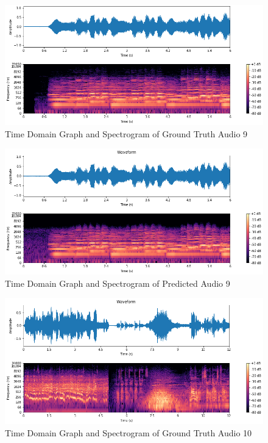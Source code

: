 \documentclass{ioereport}
\begin{document}
    \begin{figure}[H]
        \centering
        \includegraphics[width=\linewidth]{assets/audio_results/06seconds.png}
        \caption{Time Domain Graph and Spectrogram of Ground Truth Audio 9}
        \label{fig:gt-6s-spec}
    \end{figure}
    
    \begin{figure}[H]
        \centering
        \includegraphics[width=\linewidth]{assets/audio_results/06secondspred.png}
        \caption{Time Domain Graph and Spectrogram of Predicted Audio 9}
        \label{fig:pred-6s-spec}
    \end{figure}

    \begin{figure}[H]
        \centering
        \includegraphics[width=\linewidth]{assets/audio_results/12seconds.png}
        \caption{Time Domain Graph and Spectrogram of Ground Truth Audio 10}
        \label{fig:gt-12s-spec}
    \end{figure}
    
\end{document}
